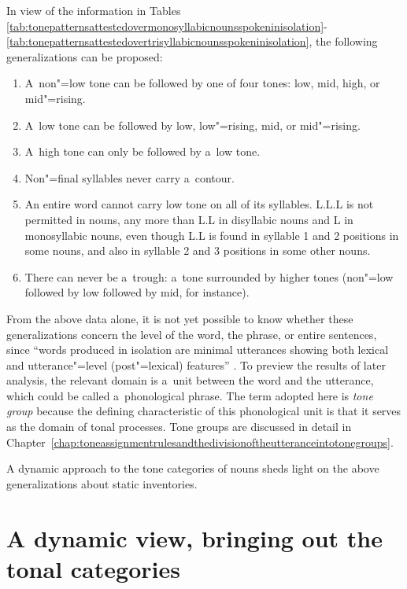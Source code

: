 In view of the information in Tables \ref{tab:tonepatternsattestedovermonosyllabicnounsspokeninisolation}-\ref{tab:tonepatternsattestedovertrisyllabicnounsspokeninisolation}, the following generalizations can be proposed: 
\begin{enumerate}[label=(\roman*), itemsep=0pt]
\item A~non"=low tone can be followed by one of four tones: low, mid, high, or mid"=rising. 
\item A~low tone can be followed by low, low"=rising, mid, or mid"=rising. 
\item A~high tone can only be followed by a~low tone.
\item	Non"=final syllables never carry a~contour. 
\item	An entire word cannot carry low tone on all of its syllables. L.L.L is not permitted in  nouns, any more than L.L in disyllabic nouns and L in monosyllabic nouns, even though L.L is found in syllable 1 and 2 positions in some  nouns, and also in syllable 2 and 3 positions in some other  nouns.
\item	There can never be a~trough: a~tone surrounded by higher tones (non"=low followed by low followed by mid, for instance). 
\end{enumerate}

From the above data alone, it is not yet possible to know whether these generalizations concern the
level of the word, the phrase, or entire sentences, since “words produced in isolation are minimal
utterances showing both lexical and utterance"=level (post"=lexical) features”
\citep[164]{himmelmann2006}. To preview the results of later analysis, the relevant domain is a~unit between the word and the utterance, which could be called a~phonological phrase. The term adopted here is \textit{tone group} because the defining characteristic
of this phonological unit is that it serves as the domain of tonal processes. Tone groups are discussed in detail in Chapter~\ref{chap:toneassignmentrulesandthedivisionoftheutteranceintotonegroups}.

A dynamic approach to the tone categories of nouns sheds light on the above generalizations about static
inventories. 


\section{A dynamic view, bringing out the tonal categories}
\label{sec:dynamicview}

